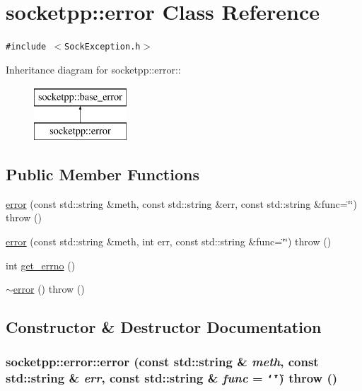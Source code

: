 \hypertarget{classsocketpp_1_1error}{
\section{socketpp::error Class Reference}
\label{classsocketpp_1_1error}
}
{\tt \#include $<$SockException.h$>$}

Inheritance diagram for socketpp::error::\begin{figure}[H]
\begin{center}
\leavevmode
\includegraphics[height=2cm]{classsocketpp_1_1error}
\end{center}
\end{figure}
\subsection*{Public Member Functions}
\begin{CompactItemize}
\item 
\hyperlink{classsocketpp_1_1error_614fef9f326d7bb212771eb20a046290}{error} (const std::string \&meth, const std::string \&err, const std::string \&func=\char`\"{}\char`\"{})  throw ()
\item 
\hyperlink{classsocketpp_1_1error_1287e8ec1ff5f7b18d91ea65c2505ae8}{error} (const std::string \&meth, int err, const std::string \&func=\char`\"{}\char`\"{})  throw ()
\item 
int \hyperlink{classsocketpp_1_1error_e1d23816909f2663b5553d232110442b}{get\_\-errno} ()
\item 
\hyperlink{classsocketpp_1_1error_f41562a951322078eff6f56268f2f257}{$\sim$error} ()  throw ()
\end{CompactItemize}


\subsection{Constructor \& Destructor Documentation}
\hypertarget{classsocketpp_1_1error_614fef9f326d7bb212771eb20a046290}{
\subsubsection[{error}]{\setlength{\rightskip}{0pt plus 5cm}socketpp::error::error (const std::string \& {\em meth}, \/  const std::string \& {\em err}, \/  const std::string \& {\em func} = {\tt \char`\"{}\char`\"{}})  throw ()}}
\label{classsocketpp_1_1error_614fef9f326d7bb212771eb20a046290}


